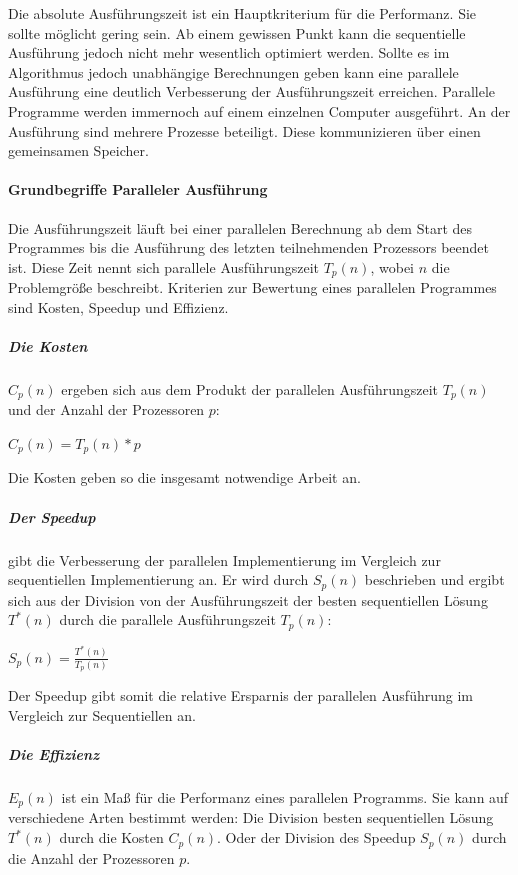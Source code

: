 \documentclass[a4paper,10pt]{article}
\begin{document}
Die absolute Ausführungszeit ist ein Hauptkriterium für die Performanz.
Sie sollte möglicht gering sein.
Ab einem gewissen Punkt kann die sequentielle Ausführung jedoch nicht mehr wesentlich optimiert werden.
Sollte es im Algorithmus jedoch unabhängige Berechnungen geben kann eine parallele Ausführung eine deutlich Verbesserung der Ausführungszeit erreichen.
Parallele Programme werden immernoch auf einem einzelnen Computer ausgeführt.
An der Ausführung sind mehrere Prozesse beteiligt.
Diese kommunizieren über einen gemeinsamen Speicher.

\paragraph{Grundbegriffe Paralleler Ausführung}

Die Ausführungszeit läuft bei einer parallelen Berechnung ab dem Start des Programmes bis die Ausführung des letzten teilnehmenden Prozessors beendet ist\cite{ppRauberRuenger}.
Diese Zeit nennt sich parallele Ausführungszeit $T_p(n)$, wobei $n$ die Problemgröße beschreibt.
Kriterien zur Bewertung eines parallelen Programmes sind Kosten, Speedup und Effizienz.

\subparagraph{Die Kosten}\cite[180]{ppRauberRuenger} $C_p(n)$ ergeben sich aus dem Produkt der parallelen Ausführungszeit $T_p(n)$ und der Anzahl der Prozessoren $p$:

\begin{center}
$C_p(n) = T_p(n) * p$
\end{center}

Die Kosten geben so die insgesamt notwendige Arbeit an.

\subparagraph{Der Speedup}\cite[180-182]{ppRauberRuenger} gibt die Verbesserung der parallelen Implementierung im Vergleich zur sequentiellen Implementierung an.
Er wird durch $S_p(n)$ beschrieben und ergibt sich aus der Division von der Ausführungszeit der besten sequentiellen Lösung $T^*(n)$ durch die parallele Ausführungszeit $T_p(n)$:

\begin{center}
$S_p(n) = \frac{T^*(n)}{T_p(n)}$
\end{center}

Der Speedup gibt somit die relative Ersparnis der parallelen Ausführung im Vergleich zur Sequentiellen an.

\subparagraph{Die Effizienz}\cite[182-183]{ppRauberRuenger} $E_p(n)$ ist ein Maß für die Performanz eines parallelen Programms.
Sie kann auf verschiedene Arten bestimmt werden:
Die Division besten sequentiellen Lösung $T^*(n)$ durch die Kosten $C_p(n)$.
Oder der Division des Speedup $S_p(n)$ durch die Anzahl der Prozessoren $p$.
\end{document}
